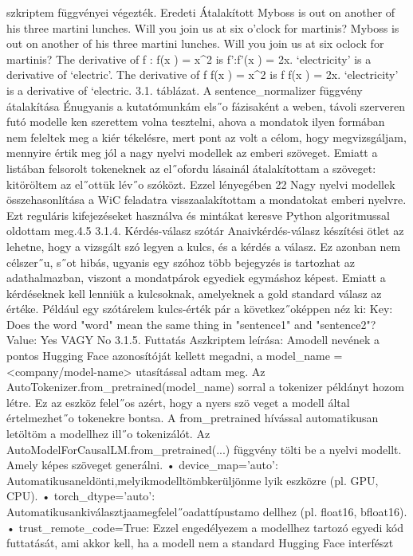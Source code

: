 \documentclass[12pt]{report}
\theoremstyle{definition}
\begin{document}
 szkriptem függvényei végezték.
 Eredeti
 Átalakított
 Myboss is out on another of his three martini lunches.
 Will you join us at six o’clock for martinis?
 Myboss is out on another of his three martini lunches.
 Will you join us at six o\’clock for martinis?
 The derivative of f : f(x ) = x^2 is f’:f’(x ) = 2x.
 ‘electricity’ is a derivative of ‘electric’.
 The derivative of f f(x ) = x^2 is f\’ f\’(x ) = 2x.
 ‘electricity’ is a derivative of ‘electric\’.
 3.1. táblázat. A sentence_normalizer függvény átalakítása
 Énugyanis a kutatómunkám els˝o fázisaként a weben, távoli szerveren futó modelle
ken szerettem volna tesztelni, ahova a mondatok ilyen formában nem feleltek meg a kiér
tékelésre, mert pont az volt a célom, hogy megvizsgáljam, mennyire értik meg jól a nagy
 nyelvi modellek az emberi szöveget. Emiatt a listában felsorolt tokeneknek az el˝ofordu
lásainál átalakítottam a szöveget: kitöröltem az el˝ottük lév˝o szóközt. Ezzel lényegében
 22
Nagy nyelvi modellek összehasonlítása a WiC feladatra
 visszaalakítottam a mondatokat emberi nyelvre. Ezt reguláris kifejezéseket használva és
 mintákat keresve Python algoritmussal oldottam meg.4.5
 3.1.4. Kérdés-válasz szótár
 Anaivkérdés-válasz készítési ötlet az lehetne, hogy a vizsgált szó legyen a kulcs, és
 a kérdés a válasz. Ez azonban nem célszer˝u, s˝ot hibás, ugyanis egy szóhoz több bejegyzés
 is tartozhat az adathalmazban, viszont a mondatpárok egyediek egymáshoz képest. Emiatt
 a kérdéseknek kell lenniük a kulcsoknak, amelyeknek a gold standard válasz az értéke.
 Például egy szótárelem kulcs-érték pár a következ˝oképpen néz ki:
 Key: Does the word "{word}" mean the same thing in
 "{sentence1}" and "{sentence2}"?
 Value: Yes VAGY No
 3.1.5. Futtatás
 Aszkriptem leírása:
 Amodell nevének a pontos Hugging Face azonosítóját kellett megadni, a
 model_name = <company/model-name>
 utasítással adtam meg. Az
 AutoTokenizer.from_pretrained(model_name)
 sorral a tokenizer példányt hozom létre. Ez az eszköz felel˝os azért, hogy a nyers szö
veget a modell által értelmezhet˝o tokenekre bontsa. A from_pretrained hívással
 automatikusan letöltöm a modellhez ill˝o tokenizálót. Az
 AutoModelForCausalLM.from_pretrained(...)
 függvény tölti be a nyelvi modellt. Amely képes szöveget generálni.
 • device_map=’auto’: Automatikusaneldönti,melyikmodelltömbkerüljönme
lyik eszközre (pl. GPU, CPU).
 • torch_dtype=’auto’: Automatikusankiválasztjaamegfelel˝oadattípustamo
dellhez (pl. float16, bfloat16).
 • trust_remote_code=True: Ezzel engedélyezem a modellhez tartozó egyedi
 kód futtatását, ami akkor kell, ha a modell nem a standard Hugging Face interfészt
\end{document}
